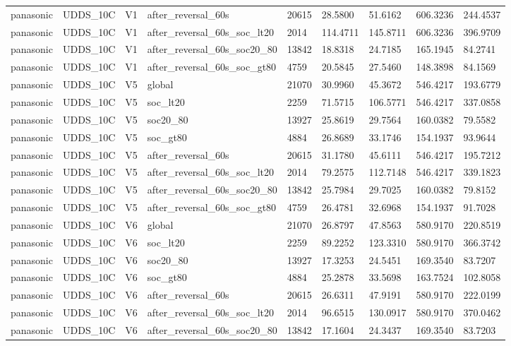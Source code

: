 \begin{tabular}{lllllllll}
panasonic & UDDS\_10C & V1 & after\_reversal\_60s & 20615 & 28.5800 & 51.6162 & 606.3236 & 244.4537 \\
panasonic & UDDS\_10C & V1 & after\_reversal\_60s\_soc\_lt20 & 2014 & 114.4711 & 145.8711 & 606.3236 & 396.9709 \\
panasonic & UDDS\_10C & V1 & after\_reversal\_60s\_soc20\_80 & 13842 & 18.8318 & 24.7185 & 165.1945 & 84.2741 \\
panasonic & UDDS\_10C & V1 & after\_reversal\_60s\_soc\_gt80 & 4759 & 20.5845 & 27.5460 & 148.3898 & 84.1569 \\
panasonic & UDDS\_10C & V5 & global & 21070 & 30.9960 & 45.3672 & 546.4217 & 193.6779 \\
panasonic & UDDS\_10C & V5 & soc\_lt20 & 2259 & 71.5715 & 106.5771 & 546.4217 & 337.0858 \\
panasonic & UDDS\_10C & V5 & soc20\_80 & 13927 & 25.8619 & 29.7564 & 160.0382 & 79.5582 \\
panasonic & UDDS\_10C & V5 & soc\_gt80 & 4884 & 26.8689 & 33.1746 & 154.1937 & 93.9644 \\
panasonic & UDDS\_10C & V5 & after\_reversal\_60s & 20615 & 31.1780 & 45.6111 & 546.4217 & 195.7212 \\
panasonic & UDDS\_10C & V5 & after\_reversal\_60s\_soc\_lt20 & 2014 & 79.2575 & 112.7148 & 546.4217 & 339.1823 \\
panasonic & UDDS\_10C & V5 & after\_reversal\_60s\_soc20\_80 & 13842 & 25.7984 & 29.7025 & 160.0382 & 79.8152 \\
panasonic & UDDS\_10C & V5 & after\_reversal\_60s\_soc\_gt80 & 4759 & 26.4781 & 32.6968 & 154.1937 & 91.7028 \\
panasonic & UDDS\_10C & V6 & global & 21070 & 26.8797 & 47.8563 & 580.9170 & 220.8519 \\
panasonic & UDDS\_10C & V6 & soc\_lt20 & 2259 & 89.2252 & 123.3310 & 580.9170 & 366.3742 \\
panasonic & UDDS\_10C & V6 & soc20\_80 & 13927 & 17.3253 & 24.5451 & 169.3540 & 83.7207 \\
panasonic & UDDS\_10C & V6 & soc\_gt80 & 4884 & 25.2878 & 33.5698 & 163.7524 & 102.8058 \\
panasonic & UDDS\_10C & V6 & after\_reversal\_60s & 20615 & 26.6311 & 47.9191 & 580.9170 & 222.0199 \\
panasonic & UDDS\_10C & V6 & after\_reversal\_60s\_soc\_lt20 & 2014 & 96.6515 & 130.0917 & 580.9170 & 370.0462 \\
panasonic & UDDS\_10C & V6 & after\_reversal\_60s\_soc20\_80 & 13842 & 17.1604 & 24.3437 & 169.3540 & 83.7203 \\

\end{tabular}
